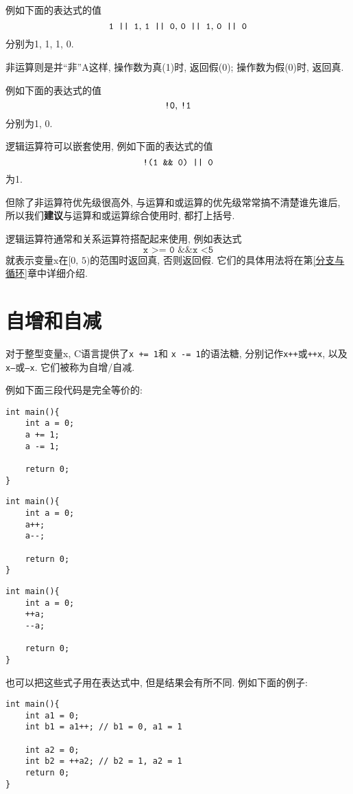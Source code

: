         例如下面的表达式的值
            \[ \mbox{\texttt{1 || 1},  \texttt{1 || 0},  \texttt{0 || 1},  \texttt{0 || 0}} \]
        分别为1, 1, 1, 0.

        非运算则是并``非''A这样, 操作数为真(1)时, 返回假(0); 操作数为假(0)时, 返回真.

        例如下面的表达式的值
            \[ \mbox{\texttt{!0},  \texttt{!1}} \]
        分别为1, 0.

        逻辑运算符可以嵌套使用, 例如下面的表达式的值
            \[ \mbox{\texttt{!(1 \&\& 0) || 0}} \]
        为1.
        
        但除了非运算符优先级很高外, 与运算和或运算的优先级常常搞不清楚谁先谁后, 所以我们\textbf{建议}与运算和或运算综合使用时, 都打上括号.

        逻辑运算符通常和关系运算符搭配起来使用, 例如表达式
            \[ \texttt{x >= 0 \&\& x <5} \]
        就表示变量x在$[0,\,5)$的范围时返回真, 否则返回假. 它们的具体用法将在第\ref{分支与循环}章中详细介绍.

    \section{自增和自减}
        对于整型变量x, C语言提供了\texttt{x += 1}和 \texttt{x -= 1}的语法糖, 分别记作\texttt{x++}或\texttt{++x}, 以及\texttt{x--}或\texttt{--x}. 它们被称为自增/自减.

        例如下面三段代码是完全等价的:
\begin{lstlisting}
int main(){
    int a = 0;
    a += 1;
    a -= 1;

    return 0;
}
\end{lstlisting}

\begin{lstlisting}
int main(){
    int a = 0;
    a++;
    a--;

    return 0;
}
\end{lstlisting}

\begin{lstlisting}
int main(){
    int a = 0;
    ++a;
    --a;

    return 0;
}
\end{lstlisting}

        也可以把这些式子用在表达式中, 但是结果会有所不同. 例如下面的例子:
\begin{lstlisting}
int main(){
    int a1 = 0;
    int b1 = a1++; // b1 = 0, a1 = 1

    int a2 = 0;
    int b2 = ++a2; // b2 = 1, a2 = 1
    return 0;
}
\end{lstlisting}

